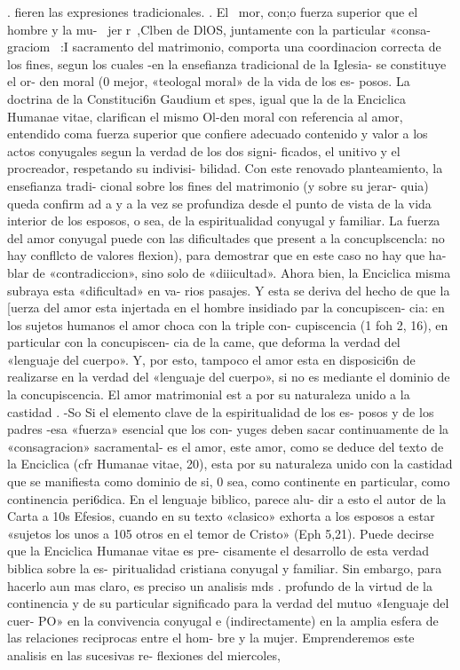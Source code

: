 \documentclass[letterpaper]{report}
\begin{document}
. fieren las expresiones tradicionales. 
	. 	El ~mor, con;o fuerza superior que el hombre y la mu- \ 
jer r~,Clben de DlOS, juntamente con la particular «consa- 
graciom ~:I sacramento del matrimonio, comporta una 
coordinacion correcta de los fines, segun los cuales -en 
la ensefianza tradicional de la Iglesia- se constituye el or- 
den moral (0 mejor, «teologal moral» de la vida de los es- 
posos. 
La doctrina de la Constituci6n Gaudium et spes, igual 
que la de la Enciclica Humanae vitae, clarifican el mismo 
Ol-den moral con referencia al amor, entendido coma 
fuerza superior que confiere adecuado contenido y valor 
a los actos conyugales segun la verdad de los dos signi- 
ficados, el unitivo y el procreador, respetando su indivisi- 
bilidad. 
Con este renovado planteamiento, la ensefianza tradi- 
cional sobre los fines del matrimonio (y sobre su jerar- 
quia) queda confirm ad a y a la vez se profundiza desde el 
punto de vista de la vida interior de los esposos, o sea, de 
la espiritualidad conyugal y familiar. 
La fuerza del amor conyugal puede 
con las dificultades que present a la concuplscencla: 
no hay confllcto de valores
flexion), para demostrar que en este caso no hay que ha- 
blar de «contradiccion», sino solo de «diiicultad». Ahora 
bien, la Enciclica misma subraya esta «dificultad» en va- 
rios pasajes. 
Y esta se deriva del hecho de que la [uerza del amor 
esta injertada en el hombre insidiado par la concupiscen- 
cia: en los sujetos humanos el amor choca con la triple con- 
cupiscencia (1 foh 2, 16), en particular con la concupiscen- 
cia de la came, que deforma la verdad del «lenguaje del 
cuerpo». Y, por esto, tampoco el amor esta en disposici6n 
de realizarse en la verdad del «lenguaje del cuerpo», si no 
es mediante el dominio de la concupiscencia. 
El amor matrimonial est a por su naturaleza 
	unido a la castidad 	. 
-So Si el elemento clave de la espiritualidad de los es- 
posos y de los padres -esa «fuerza» esencial que los con- 
yuges deben sacar continuamente de la «consagracion» 
sacramental- es el amor, este amor, como se deduce del 
texto de la Enciclica (cfr Humanae vitae, 20), esta por su 
naturaleza unido con la castidad que se manifiesta como 
dominio de si, 0 sea, como continente en particular, como 
continencia peri6dica. En el lenguaje biblico, parece alu- 
dir a esto el autor de la Carta a 10s Efesios, cuando en su 
texto «clasico» exhorta a los esposos a estar «sujetos los 
unos a 105 otros en el temor de Cristo» (Eph 5,21). 
Puede decirse que la Enciclica Humanae vitae es pre- 
cisamente el desarrollo de esta verdad biblica sobre la es- 
piritualidad cristiana conyugal y familiar. Sin embargo, 
para hacerlo aun mas claro, es preciso un analisis mds 
. profundo de la virtud de la continencia y de su particular 
significado para la verdad del mutuo «Ienguaje del cuer- 
PO» en la convivencia conyugal e (indirectamente) en la 
amplia esfera de las relaciones reciprocas entre el hom- 
bre y la mujer. 
Emprenderemos este analisis en las sucesivas re- 
flexiones del miercoles, 
\end{document}
